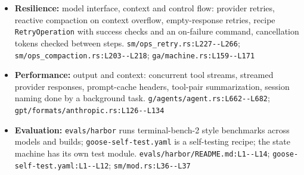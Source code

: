 \begin{itemize}
\item \textbf{Resilience:} model interface, context and control flow: provider retries, reactive compaction on context overflow, empty-response retries, recipe \texttt{RetryOperation} with success checks and an on-failure command, cancellation tokens checked between steps. \texttt{sm/\allowbreak{}ops\_\allowbreak{}retry.\allowbreak{}rs:\allowbreak{}L227-\allowbreak{}-\allowbreak{}L266}; \texttt{sm/\allowbreak{}ops\_\allowbreak{}compaction.\allowbreak{}rs:\allowbreak{}L203-\allowbreak{}-\allowbreak{}L218}; \texttt{ga/\allowbreak{}machine.\allowbreak{}rs:\allowbreak{}L159-\allowbreak{}-\allowbreak{}L171}
\item \textbf{Performance:} output and context: concurrent tool streams, streamed provider responses, prompt-cache headers, tool-pair summarization, session naming done by a background task. \texttt{g/\allowbreak{}agents/\allowbreak{}agent.\allowbreak{}rs:\allowbreak{}L662-\allowbreak{}-\allowbreak{}L682}; \texttt{gpt/\allowbreak{}formats/\allowbreak{}anthropic.\allowbreak{}rs:\allowbreak{}L126-\allowbreak{}-\allowbreak{}L134}
\item \textbf{Evaluation:} \texttt{evals/\allowbreak{}harbor} runs terminal-bench-2 style benchmarks across models and builds; \texttt{goose-\allowbreak{}self-\allowbreak{}test.\allowbreak{}yaml} is a self-testing recipe; the state machine has its own test module. \texttt{evals/\allowbreak{}harbor/\allowbreak{}README.\allowbreak{}md:\allowbreak{}L1-\allowbreak{}-\allowbreak{}L14}; \texttt{goose-\allowbreak{}self-\allowbreak{}test.\allowbreak{}yaml:\allowbreak{}L1-\allowbreak{}-\allowbreak{}L12}; \texttt{sm/\allowbreak{}mod.\allowbreak{}rs:\allowbreak{}L36-\allowbreak{}-\allowbreak{}L37}
\end{itemize}

